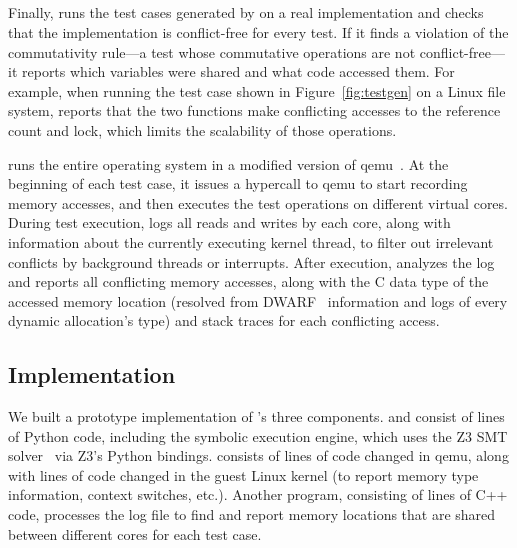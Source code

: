 \subsection{\mtrace{}}
\label{sec:model:mtrace}

\cbstart Finally, \mtrace runs the test cases generated by \generator on
a real implementation and checks that the implementation is
conflict-free for every test.  If it finds a violation of the
commutativity rule---a test whose commutative operations are not
conflict-free---it reports which variables were shared and what code
accessed them.
%
For example, when running the
test case shown in Figure~\ref{fig:testgen} on a Linux 
file system, \mtrace{} reports that the two functions make conflicting
accesses to the  reference count and lock, which limits
the scalability of those operations.

\mtrace{} runs the entire operating system in a modified version of
qemu~\cite{qemu}.  At the beginning of each test case, it issues a hypercall to
qemu to start recording memory accesses, and then executes the test
operations on different virtual cores.  During test execution,
\mtrace{} logs all reads and writes by each core, along with
information about the currently executing kernel thread,
to filter out irrelevant conflicts by background threads or
interrupts.  After execution, \mtrace analyzes
the log and reports all conflicting memory accesses, along with the C
data type of the accessed memory location (resolved from
DWARF~\cite{dwarf} information and logs
of every dynamic allocation's type) and stack traces for each conflicting
access.
\cbend

\subsection{Implementation}
\label{sec:model:impl}

\cbstart
We built a prototype implementation of \tool{}'s three components.
\analyzer{} and \generator{} consist of
 lines of Python code,
including the symbolic execution engine, which uses the Z3 SMT
solver~\cite{demoura:z3}
via Z3's Python bindings.
\mtrace{} consists of  lines of
code changed in qemu, along with 
lines of code changed in the guest
Linux kernel (to report memory type information, context switches, etc.).
Another program, consisting of 
lines of C++ code, processes the
log file to find and report memory locations that are shared between different
cores for each test case.
\cbend

